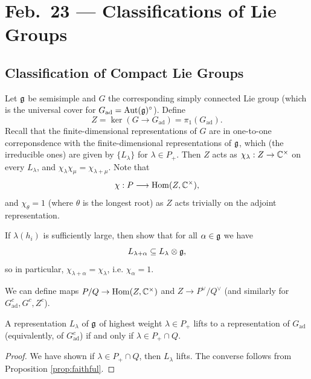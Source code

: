 \chapter{Feb.~23 --- Classifications of Lie Groups}

\section{Classification of Compact Lie Groups}

\begin{remark}
  Let $\mathfrak{g}$ be semisimple and $G$ the
  corresponding simply connected
  Lie group (which is the universal
  cover for $G_{\mathrm{ad}} = \operatorname{Aut}(\mathfrak{g})^\circ$).
  Define
  \[
    Z = \ker(G \to G_{\mathrm{ad}})
    = \pi_1(G_{\mathrm{ad}}).
  \]
  Recall that the finite-dimensional
  representations of $G$ are in one-to-one
  correponsdence with the finite-dimensional
  representations of $\mathfrak{g}$, which
  (the irreducible ones) are given by
  $\{L_\lambda\}$ for $\lambda \in P_+$.
  Then $Z$ acts as $\chi_\lambda : Z \to \mathbb{C}^\times$
  on every $L_\lambda$, and
  $\chi_\lambda \chi_\mu = \chi_{\lambda + \mu}$.
  Note that
  \[
    \chi : P
    \longrightarrow \operatorname{Hom}(Z, \mathbb{C}^\times),
  \]
  and $\chi_\theta = 1$ (where $\theta$ is the
  longest root)
  as $Z$ acts trivially on the
  adjoint representation.
\end{remark}

\begin{exercise}
  If $\lambda(h_i)$ is sufficiently
  large, then show that
  for all $\alpha \in \mathfrak{g}$ we have
  \[L_{\lambda + \alpha} \subseteq L_{\lambda} \otimes \mathfrak{g},\]
  so in particular,
  $\chi_{\lambda + \alpha} = \chi_\lambda$,
  i.e. $\chi_\alpha = 1$.
\end{exercise}

\begin{remark}
  We can define maps
  $P / Q \to \operatorname{Hom}(Z, \mathbb{C}^\times)$ and
  $Z \to P^\vee / Q^\vee$ (and similarly
  for $G^c_{\mathrm{ad}}, G^c, Z^c$).
\end{remark}

\begin{prop}
  A representation $L_\lambda$ of $\mathfrak{g}$
  of highest weight $\lambda \in P_+$
  lifts to a representation of
  $G_{\mathrm{ad}}$ (equivalently, of
  $G_{\mathrm{ad}}^c$)
  if and only if $\lambda \in P_+ \cap Q$.
\end{prop}

\begin{proof}
  We have shown if
  $\lambda \in P_+ \cap Q$, then
  $L_\lambda$ lifts. The converse
  follows from
  Proposition
  \ref{prop:faithful}.
\end{proof}

